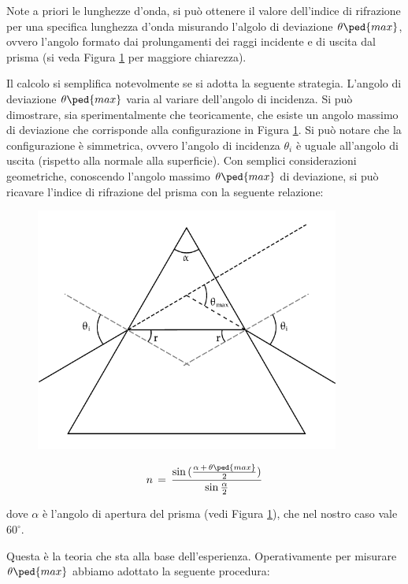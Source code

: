 Note a priori le lunghezze d'onda, si può ottenere il valore dell'indice di rifrazione per una specifica lunghezza d'onda misurando l'algolo di deviazione $\theta\ped{max}$, ovvero l'angolo formato dai prolungamenti dei raggi incidente e di uscita dal prisma (si veda Figura \ref{fig:prisma} per maggiore chiarezza).

Il calcolo si semplifica notevolmente se si adotta la seguente strategia. L'angolo di deviazione $\theta\ped{max}$ varia al variare dell'angolo di incidenza. Si può dimostrare, sia sperimentalmente che teoricamente, che esiste un angolo massimo di deviazione che corrisponde alla configurazione in Figura \ref{fig:prisma}. Si può notare che la configurazione è simmetrica, ovvero l'angolo di incidenza $\theta_i$ è uguale all'angolo di uscita (rispetto alla normale alla superficie). Con semplici considerazioni geometriche, conoscendo l'angolo massimo $\theta\ped{max}$ di deviazione, si può ricavare l'indice di rifrazione del prisma con la seguente relazione:

\begin{figure}
    \includegraphics[width=10cm]{prisma1.pdf}
    \caption{}
    \label{fig:prisma}
\end{figure}

\begin{equation}
	n \,=\, \frac{\sin{(\frac{\alpha \,+\, \theta\ped{max}}{2})}}{\sin{\frac{\alpha}{2}}}
	\label{indice_rif}
\end{equation}

dove $\alpha$ è l'angolo di apertura del prisma (vedi Figura \ref{fig:prisma}), che nel nostro caso vale $60^\circ$.

Questa è la teoria che sta alla base dell'esperienza. Operativamente per misurare $\theta\ped{max}$ abbiamo adottato la seguente procedura:

